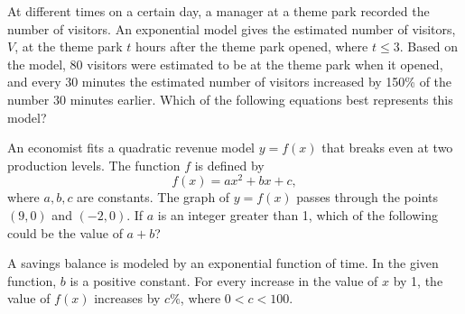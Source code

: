 
\vspace{2em}
\newpage

\noindent\markforreview
\vspace{1em}
\vspace{1em}

At different times on a certain day, a manager at a theme park recorded the number of visitors.  
An exponential model gives the estimated number of visitors, $V$, at the theme park $t$ hours after the theme park opened, where $t \leq 3$.  
Based on the model, 80 visitors were estimated to be at the theme park when it opened,  
and every 30 minutes the estimated number of visitors increased by 150\% of the number 30 minutes earlier.  
Which of the following equations best represents this model?

\vspace{0.75em}


\vspace{2em}
\newpage

\newpage

\noindent\markforreview
\vspace{1em}
\vspace{1em}

An economist fits a quadratic revenue model \(y = f(x)\) that breaks even at two production levels. The function \(f\) is defined by
\[
f(x) = ax^2 + bx + c,
\]
where \(a, b, c\) are constants. The graph of \(y = f(x)\) passes through the points \((9, 0)\) and \((-2, 0)\). If \(a\) is an integer greater than 1, which of the following could be the value of \(a + b\)?

\vspace{0.75em}


\vspace{2em}
\newpage

\noindent\markforreview
\vspace{1em}
\vspace{1em}

A savings balance is modeled by an exponential function of time. In the given function, \(b\) is a positive constant. For every increase in the value of \(x\) by 1, the value of \(f(x)\) increases by \(c\%\), where \(0 < c < 100\).

